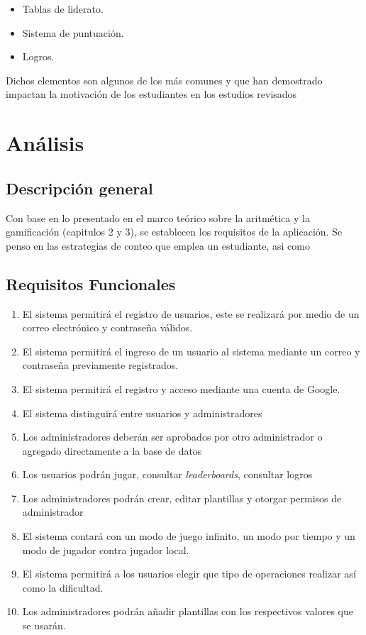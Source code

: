 \documentclass{article}
\begin{document}
\begin{itemize}
\item{Tablas de liderato.}
\item{Sistema de puntuación.}
\item{Logros.}
\end{itemize}

Dichos elementos son algunos de los más comunes y que han demostrado impactan la motivación de los
estudiantes en los estudios revisados \cite{wiggins2016overview,sanchez2017classcraft,ibanez2014gamification,tan2018}
\pagebreak



\section{Análisis}

\subsection{Descripción general}
Con base en lo presentado en el marco teórico sobre la aritmética y la gamificación (capitulos 2 y 3),
se establecen los requisitos de la aplicación. Se penso en las estrategias de conteo que emplea un 
estudiante, asi como 

\subsection{Requisitos Funcionales}
\begin{enumerate}
\item {El sistema permitirá el registro de usuarios, este se realizará por medio de un correo electrónico y contraseña válidos.}
\item{El sistema permitirá el ingreso de un usuario al sistema mediante un correo y contraseña  previamente registrados.}
\item {El sistema permitirá el registro y acceso mediante una cuenta de Google.}
\item{El sistema distinguirá entre usuarios y administradores}
\item{Los administradores deberán ser aprobados por otro administrador o agregado directamente a la base de datos}
\item{Los usuarios podrán jugar, consultar \emph{leaderboards}, consultar logros}
\item{Los administradores podrán crear, editar plantillas y otorgar permisos de administrador}
\item {El sistema contará con un modo de juego infinito, un modo por tiempo y un modo de jugador contra jugador local.}
\item{El sistema permitirá a los usuarios elegir que tipo de operaciones realizar así como la dificultad.}
\item{Los administradores podrán añadir plantillas con los respectivos valores que se usarán.}
\end{enumerate}
\end{document}
